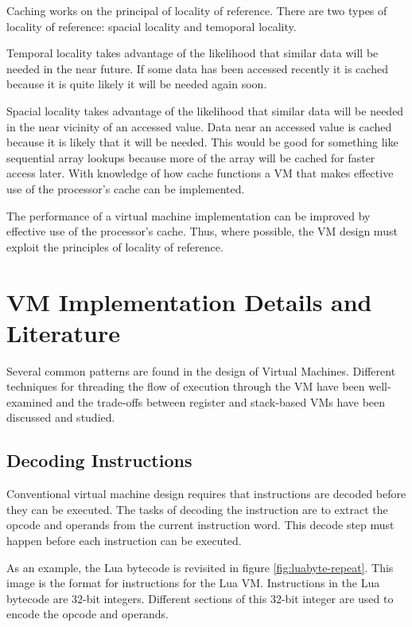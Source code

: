 \documentclass[english,a4paper,12pt]{report}
\begin{document}
Caching works on the principal of locality of reference. There are two
types of locality of reference: spacial locality and temoporal
locality.

Temporal locality takes advantage of the likelihood that similar data
will be needed in the near future. If some data has been accessed
recently it is cached because it is quite likely it will be needed
again soon.

Spacial locality takes advantage of the likelihood that similar data
will be needed in the near vicinity of an accessed value. Data near an
accessed value is cached because it is likely that it will be
needed. This would be good for something like sequential array lookups
because more of the array will be cached for faster access later. With
knowledge of how cache functions a VM that makes effective use of the
processor's cache can be implemented.

The performance of a virtual machine implementation can be improved by
effective use of the processor's cache. Thus, where possible, the VM
design must exploit the principles of locality of reference.

\section{VM Implementation Details and Literature}
\label{sec:conv-impl}

Several common patterns are found in the design of Virtual
Machines. Different techniques for threading the flow of execution
through the VM have been well-examined and the trade-offs between
register and stack-based VMs have been discussed and studied.

\subsection{Decoding Instructions}
\label{sec:decode}
Conventional virtual machine design requires that instructions are
decoded before they can be executed. The tasks of decoding the
instruction are to extract the opcode and operands from the current
instruction word. This decode step must happen before each
instruction can be executed. 

As an example, the Lua bytecode is revisited in figure
\ref{fig:luabyte-repeat}. This image is the format for instructions
for the Lua VM. Instructions in the Lua bytecode are 32-bit
integers. Different sections of this 32-bit integer are used to encode
the opcode and operands.
\end{document}
